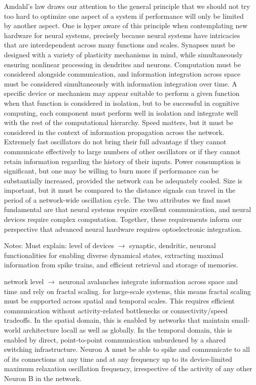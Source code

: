 \documentclass[twocolumn]{article}
\begin{document}
Amdahl's law draws our attention to the general principle that we should not try too hard to optimize one aspect of a system if performance will only be limited by another aspect. One is hyper aware of this principle when contemplating new hardware for neural systems, precisely because neural systems have intricacies that are interdependent across many functions and scales. Synapses must be designed with a variety of plasticity mechanisms in mind, while simultaneously ensuring nonlinear processing in dendrites and neurons. Computation must be considered alongside communication, and information integration across space must be considered simultaneously with information integration over time. A specific device or mechanism may appear suitable to perform a given function when that function is considered in isolation, but to be successful in cognitive computing, each component must perform well in isolation and integrate well with the rest of the computational hierarchy. Speed matters, but it must be considered in the context of information propagation across the network. Extremely fast oscillators do not bring their full advantage if they cannot communicate effectively to large numbers of other oscillators or if they cannot retain information regarding the history of their inputs. Power consumption is significant, but one may be willing to burn more if performance can be substantially increased, provided the network can be adequately cooled. Size is important, but it must be compared to the distance signals can travel in the period of a network-wide oscillation cycle. The two attributes we find most fundamental are that neural systems require excellent communication, and neural devices require complex computation. Together, these requirements inform our perspective that advanced neural hardware requires optoelectronic integration.

\vspace{10em}
Notes:
\vspace{4em}
\vspace{4em}
Must explain: level of devices $\longrightarrow$ synaptic, dendritic, neuronal functionalities for enabling diverse dynamical states, extracting maximal information from spike trains, and efficient retrieval and storage of memories.

network level $\longrightarrow$ neuronal avalanches integrate information across space and time and rely on fractal scaling. for large-scale systems, this means fractal scaling must be supported across spatial and temporal scales. This requires efficient communication without activity-related bottlenecks or connectivity/speed tradeoffs. In the spatial domain, this is enabled by networks that maintain small-world architecture locall as well as globally. In the temporal domain, this is enabled by direct, point-to-point communication unburdened by a shared switching infrastructure. Neuron A must be able to spike and communicate to all of its connections at any time and at any frequency up to its device-limited maximum relaxation oscillation frequency, irrespective of the activity of any other Neuron B in the network.
\end{document}
